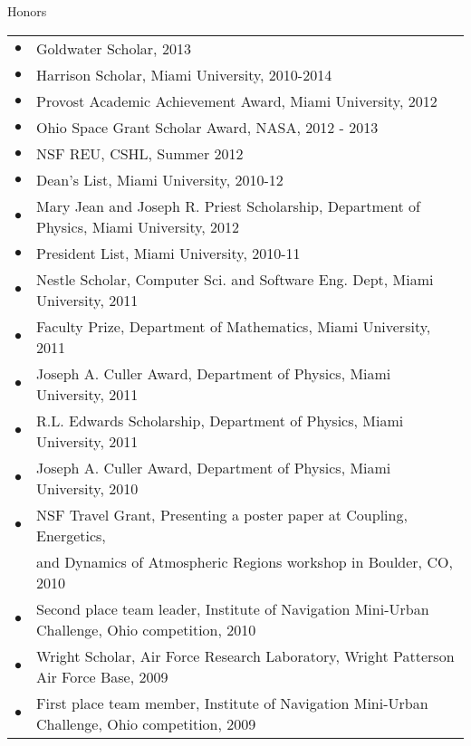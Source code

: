 \documentclass{resume} %
\begin{document}
\begin{rSection}{Honors}
  \begin{tabular}{ll}
    $\bullet$ & Goldwater Scholar, 2013\\
    $\bullet$ & Harrison Scholar, Miami University, 2010-2014\\
    $\bullet$ & Provost Academic Achievement Award, Miami University, 2012\\
    $\bullet$ & Ohio Space Grant Scholar Award, NASA, 2012 - 2013\\
    $\bullet$ & NSF REU, CSHL, Summer 2012\\
    $\bullet$ & Dean’s List, Miami University, 2010-12\\
    $\bullet$ & Mary Jean and Joseph R. Priest Scholarship, Department of Physics, Miami University, 2012\\
    $\bullet$ & President List, Miami University, 2010-11\\
    $\bullet$ & Nestle Scholar, Computer Sci. and Software Eng. Dept, Miami University, 2011\\
    $\bullet$ & Faculty Prize, Department of Mathematics, Miami University, 2011\\
    $\bullet$ & Joseph A. Culler Award, Department of Physics, Miami University, 2011\\
    $\bullet$ & R.L. Edwards Scholarship, Department of Physics, Miami University, 2011\\
    $\bullet$ & Joseph A. Culler Award, Department of Physics, Miami University, 2010\\
    $\bullet$ & NSF Travel Grant, Presenting a poster paper at Coupling, Energetics, \\
              & and Dynamics of Atmospheric Regions workshop in Boulder, CO, 2010\\
    $\bullet$ & Second place team leader, Institute of Navigation Mini-Urban Challenge, Ohio competition, 2010\\
    $\bullet$ & Wright Scholar, Air Force Research Laboratory, Wright Patterson Air Force Base, 2009\\
    $\bullet$ & First place team member, Institute of Navigation Mini-Urban Challenge, Ohio competition, 2009\\
  \end{tabular}
\end{rSection}
\end{document}
